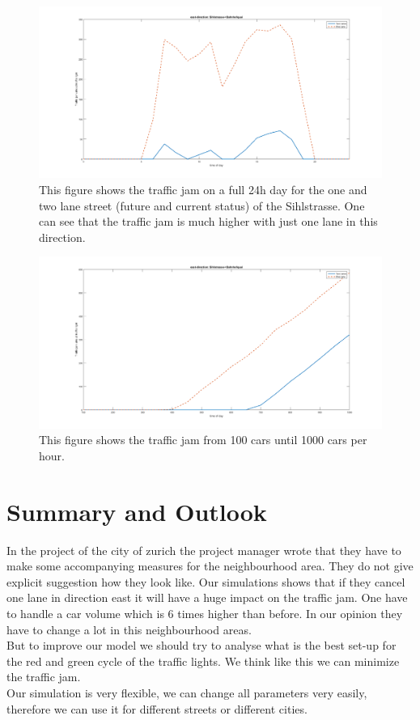 \documentclass[11pt]{article}
\begin{document}
\begin{figure}[h]
	\centering
\includegraphics[width=\textwidth]{Comparison_Traffic_jam.png}
\caption{This figure shows the traffic jam on a full 24h day for the one and two lane street (future and current status) of the Sihlstrasse. One can see that the traffic jam is much higher with just one lane in this direction. }
\label{traffic24_1_lane}
\end{figure}
\begin{figure}[h!]
	\centering
\includegraphics[width=\textwidth]{Comparison_Traffic_jam_1000.png}
\caption{This figure shows the traffic jam from 100 cars until 1000 cars per hour. }
\label{traffic24_carvolume}
\end{figure}


\section{Summary and Outlook}

In the project of the city of zurich \cite{project} the project manager wrote that they have to make some accompanying measures for the neighbourhood area. They do not give explicit suggestion how they look like. Our simulations shows that if they cancel one lane in direction east it will have a huge impact on the traffic jam. One have to handle a car volume which is 6 times higher than before. In our opinion they have to change a lot in this neighbourhood areas.\\
But to improve our model we should try to analyse what is the best set-up for the red and green cycle of the traffic lights. We think like this we can minimize the traffic jam.\\
Our simulation is very flexible, we can change all parameters very easily, therefore we can use it for different streets or different cities.
\end{document}

